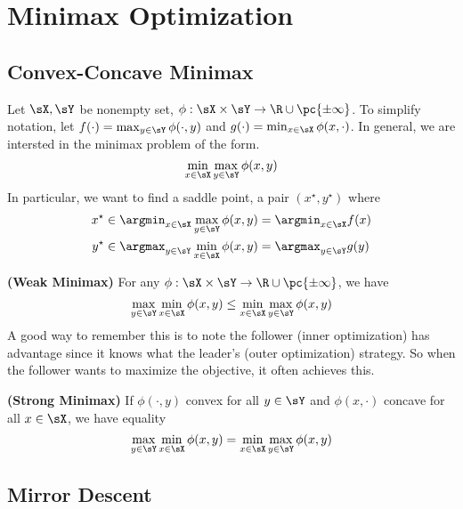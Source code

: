 \documentclass[../summary.tex]{subfiles}
\begin{document}
\newcommand\bdelta{\ensuremath{\boldsymbol{\delta}}}

\section{Minimax Optimization}


\subsection{Convex-Concave Minimax}

Let $\sX,\sY$ be nonempty set, $\phi:\sX\times\sY\to \R\cup\pc{\pm\infty}$. To simplify notation, let $f(\cdot) = \max_{y\in\sY} \phi(\cdot,y)$ and $g(\cdot) = \min_{x\in\sX} \phi(x,\cdot)$. In general, we are intersted in the minimax problem of the form. 
\[
    \min_{x\in\sX} \max_{y\in\sY} \phi(x,y)
\]
In particular, we want to find a saddle point, a pair $(x^\star,y^\star)$ where 
\begin{align*}
    x^\star
        &\in \argmin_{x\in\sX} \max_{y\in\sY} \phi(x,y) = \argmin_{x\in\sX} f(x) \\
    y^\star
        &\in \argmax_{y\in\sY} \min_{x\in\sX} \phi(x,y) = \argmax_{y\in\sY} g(y) 
\end{align*}

\begin{definition*}
    \textbf{(Weak Minimax)} For any $\phi:\sX\times\sY\to\R\cup\pc{\pm\infty}$, we have
    \[
        \max_{y\in\sY} \min_{x\in\sX} \phi(x,y)
            \leq \min_{x\in\sX} \max_{y\in\sY} \phi(x,y)    
    \]
    A good way to remember this is to note the follower (inner optimization) has advantage since it knows what the leader's (outer optimization) strategy. So when the follower wants to maximize the objective, it often achieves this.
\end{definition*}
\begin{definition*}
    \textbf{(Strong Minimax)} If $\phi(\cdot,y)$ convex for all $y\in\sY$ and $\phi(x,\cdot)$ concave for all $x\in\sX$, we have equality 
    \[
        \max_{y\in\sY} \min_{x\in\sX} \phi(x,y)
            = \min_{x\in\sX} \max_{y\in\sY} \phi(x,y)    
    \]
\end{definition*}


\subsection{Mirror Descent}
\end{document}

